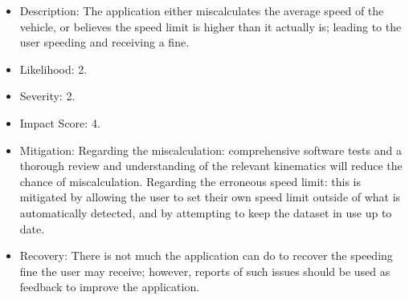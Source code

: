 \documentclass[11pt, a4paper, notitlepage]{report}
\begin{document}
\begin{enumerate}
\begin{itemize}
        \item Description: The application either miscalculates the average speed of the vehicle, or believes the speed limit is higher than it actually is; leading to the user speeding and receiving a fine.
        \item Likelihood: 2.
        \item Severity: 2.
        \item Impact Score: 4.
        \item Mitigation: Regarding the miscalculation: comprehensive software tests and a thorough review and understanding of the relevant kinematics will reduce the chance of miscalculation. Regarding the erroneous speed limit: this is mitigated by allowing the user to set their own speed limit outside of what is automatically detected, and by attempting to keep the dataset in use up to date.
        \item Recovery: There is not much the application can do to recover the speeding fine the user may receive; however, reports of such issues should be used as feedback to improve the application.
    \end{itemize}
\end{enumerate}    


\end{document}
